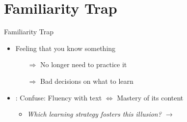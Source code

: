 \documentclass{ercisbeamer}
\begin{document}
\section{Familiarity Trap}
\begin{frame}{Familiarity Trap}
    \begin{tbox}
        \begin{itemize}
            \item Feeling that you know something
            \begin{itemize}
                \item[$\Rightarrow$] No longer need to practice it
                \item[$\Rightarrow$] Bad decisions on what to learn
            \end{itemize}
            
            \item {}: Confuse: Fluency with text $\Leftrightarrow$ Mastery of its content
            \begin{itemize}
                \item \emph{Which learning strategy fosters this illusion? \pause $\rightarrow$ }
            \end{itemize}
        \end{itemize}
    \end{tbox}
\end{frame}

\end{document}
